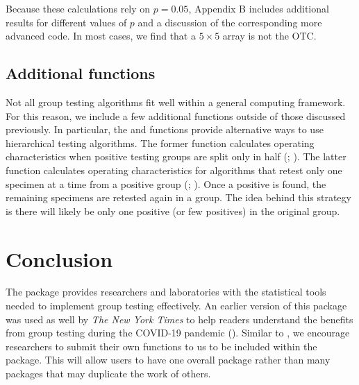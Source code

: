 Because these calculations rely on $p=0.05$, Appendix B includes
additional results for different values of $p$ and a discussion of
the corresponding more advanced code. In most cases, we find that
a $5\times5$ array is not the OTC. 

\subsection[Additional functions]{Additional functions\label{subsec:Additional functions-1}}

Not all group testing algorithms fit well within a general computing
framework. For this reason, we include a few additional functions
outside of those discussed previously. In particular, the 
and  functions provide alternative ways to use hierarchical
testing algorithms. The former function calculates operating characteristics
when positive testing groups are split only in half (\citealt{litvak1994screening};
\citealt{black2012group}). The latter function calculates operating
characteristics for algorithms that retest only one specimen at a
time from a positive group (\citealt{sterrett1957detection}; \citealt{Bilder2010a}).
Once a positive is found, the remaining specimens are retested again
in a group. The idea behind this strategy is there will likely be
only one positive (or few positives) in the original group. 


\section[Conclusion]{Conclusion\label{sec:Conclusion}}

The  package provides researchers and laboratories
with the statistical tools needed to implement group testing 
effectively. An earlier version of this package was used as well
by \emph{The New York Times} to help readers understand the benefits
from group testing during the COVID-19 pandemic (\citealt{NYTimesBui}).
Similar to \citet{Bilder2010b}, we encourage researchers to submit
their own functions to us to be included within the package. This
will allow users to have one overall package rather than many packages
that may duplicate the work of others. 

